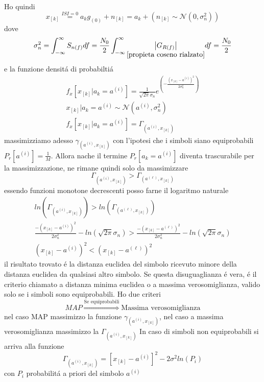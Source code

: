             Ho quindi 
            \[
                x_{[k]} \overset{ISI=0}{=} a_kg_{(0)} + n_{[k]} = a_k + (n_{[k]} \sim \mathcal{N}(0,\sigma_n^2))
            \]
            dove 
            \[
                \sigma_n^2 = \int_{-\infty}^{\infty}S_{n(f)}df = \frac{N_0}{2} \int_{-\infty}^{\infty}\underset{\ref{propieta coseno rialzato}}{\left| G_{R(f)} \right|} df = \frac{N_0}{2}  
            \]
            e la funzione densitá di probabiltiá 
            \begin{gather}
                f_x[x_{[k]}|a_k = a^{(i)}] = \frac{1}{\sqrt{2\pi}\sigma_n}e^{\left(\displaystyle -\frac{(x_{[k]}-a^{(i)})^2}{2\sigma_n^2}\right)} \nonumber \\
                x_{[k]} | a_k = a^{(i)} \sim \mathcal{N}(a^{(i)},\sigma_n^2)\nonumber \\
                f_x[x_{[k]}|a_k = a^{(i)}] = \Gamma_{(a^{(i)},x_{[k]})} \nonumber
            \end{gather}
            massimizziamo adesso $\gamma_{(a^{(i)},x_{[k]})}$ con l'ipotesi che i simboli siano equiprobabili $P_r[a^{(i)}] = \frac{1}{M}$. Allora nache il termine
            $P_r[a_k = a^{(i)}]$ diventa trascurabile per la massimizzazione, ne rimane quindi solo da massimizzare
            \[
                \Gamma_{(a^{(i)},x_{[k]})} > \Gamma_{(a^{(\ell)},x_{[k]})}    
            \]
            essendo funzioni monotone decrescenti posso farne il logaritmo naturale
            \begin{gather}
                ln\left(\Gamma_{(a^{(i)},x_{[k]})} \right)> ln\left(\Gamma_{(a^{(\ell)},x_{[k]})}\right) \nonumber\\
                \frac{-\left(x_{[k]}-a^{(i)}\right)^2}{2\sigma_n^2}-ln\left(\sqrt{2\pi}\sigma_n\right) >  \frac{-\left(x_{[k]}-a^{(\ell)}\right)^2}{2\sigma_n^2}-ln\left(\sqrt{2\pi}\sigma_n\right)\nonumber \\
                \left(x_{[k]}-a^{(i)}\right)^2<\left(x_{[k]}-a^{(\ell)}\right)^2\nonumber    
            \end{gather}
            il risultato trovato é la distanza euclidea del simbolo ricevuto minore della distanza euclidea da qualsiasi altro simbolo. Se
            questa disuguaglianza é vera, é il criterio chiamato a distanza minima euclidea o a massima verosomiglianza, valido solo se i simboli
            sono equiprobabili. Ho due criteri 
            \[
                MAP \overset{\text{Se equiprobabili}}{\Rightarrow} \text{Massima verosomiglianza}  
            \] 
            nel caso MAP massimizzo la funzione $\gamma_{(a^{(i)},x_{[k]})}$, nel caso a massima verosomiglianza massimizzo la $\Gamma_{(a^{(i)},x_{[k]})}$ 
            In caso di simboli non equiprobabili si arriva alla funzione 
            \[
                \Gamma_{(a^{(i)},x_{[k]})} = \left[x_{[k]}-a^{(i)}\right]^2-2\sigma^2ln(P_i)
            \]
            con $P_i$ probabilitá a priori del simbolo $a^{(i)}$
